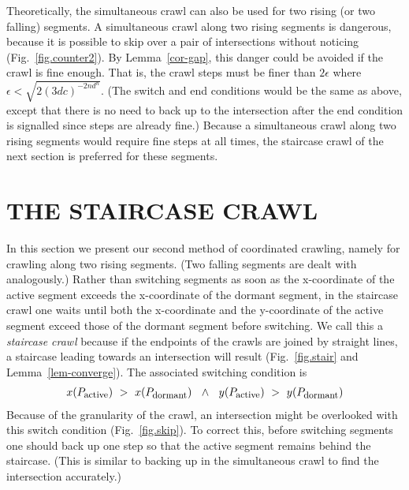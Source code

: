 Theoretically, the simultaneous crawl can also be used for two rising (or two falling) segments.
A simultaneous crawl along two rising segments is dangerous, 
because it is possible to skip over a pair of intersections without noticing 
(Fig.~\ref{fig.counter2}).
By Lemma~\ref{cor-gap}, this danger could be avoided if the crawl is fine enough.
That is, the crawl steps must be finer than $2\epsilon$ where 
$\epsilon < \sqrt{2 (3dc)^{-2nd^{n}}}$.
(The switch and end conditions would be the same as above, except that there is no need to 
back up to the intersection after the end condition is signalled since steps are already fine.)
Because a simultaneous crawl along two rising segments would require fine steps at all times, 
the staircase crawl of the next section is preferred for these segments.


\section{THE STAIRCASE CRAWL}
\label{sec-stair}

In this section we present our second method of coordinated crawling, namely for crawling
along two rising segments.
(Two falling segments are dealt with analogously.)
Rather than switching segments as soon as the x-coordinate of the active segment exceeds
the x-coordinate of the dormant segment,
in the staircase crawl one waits until both the x-coordinate and the y-coordinate of the active
segment exceed those of the dormant segment before switching.
We call this a {\em staircase crawl} because if the 
endpoints of the crawls are joined by straight lines, a staircase leading towards an intersection
will result (Fig.~\ref{fig.stair} and Lemma~\ref{lem-converge}).
The associated switching condition is
\begin{eqnarray*}
	x(P_{\mbox{\footnotesize{active}}}) \  > \ 
	x(P_{\mbox{\footnotesize{dormant}}}) \ \ \wedge \ \ 
	y(P_{\mbox{\footnotesize{active}}}) \ > \ 
	y(P_{\mbox{\footnotesize{dormant}}})
\end{eqnarray*}
Because of the granularity of the crawl, an intersection might be overlooked with this switch
condition (Fig.~\ref{fig.skip}).
To correct this, before switching segments one should back up one step so that the active 
segment remains behind the staircase.
(This is similar to backing up in the simultaneous crawl to find the intersection accurately.)

